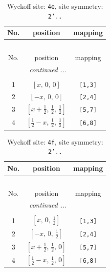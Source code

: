 \documentclass[fleqn,8pt]{jsarticle}
\begin{document}
\begin{longtable}{ccc}
\caption{Wyckoff site: {\tt 4e}, site symmetry: {\tt 2'..}}
 \\
 \hline \hline
No. & position & mapping \\ \hline \endfirsthead

\multicolumn{2}{l}{\tablename\ \thetable{}} \\
 \hline \hline
No. & position & mapping \\ \hline \endhead

 \hline \hline
\multicolumn{2}{r}{\footnotesize\it continued ...} \\ \endfoot

 \hline \hline
\multicolumn{2}{r}{} \\ \endlastfoot

1 & $\left[ x,\, 0,\, 0 \right]$ & {\tt [1,3]} \\ \hline
2 & $\left[ - x,\, 0,\, 0 \right]$ & {\tt [2,4]} \\ \hline
3 & $\left[ x + \frac{1}{2},\, \frac{1}{2},\, \frac{1}{2} \right]$ & {\tt [5,7]} \\ \hline
4 & $\left[ \frac{1}{2} - x,\, \frac{1}{2},\, \frac{1}{2} \right]$ & {\tt [6,8]} \\
\end{longtable}
\renewcommand{\arraystretch}{1.2}
\begin{longtable}{ccc}
\caption{Wyckoff site: {\tt 4f}, site symmetry: {\tt 2'..}}
 \\
 \hline \hline
No. & position & mapping \\ \hline \endfirsthead

\multicolumn{2}{l}{\tablename\ \thetable{}} \\
 \hline \hline
No. & position & mapping \\ \hline \endhead

 \hline \hline
\multicolumn{2}{r}{\footnotesize\it continued ...} \\ \endfoot

 \hline \hline
\multicolumn{2}{r}{} \\ \endlastfoot

1 & $\left[ x,\, 0,\, \frac{1}{2} \right]$ & {\tt [1,3]} \\ \hline
2 & $\left[ - x,\, 0,\, \frac{1}{2} \right]$ & {\tt [2,4]} \\ \hline
3 & $\left[ x + \frac{1}{2},\, \frac{1}{2},\, 0 \right]$ & {\tt [5,7]} \\ \hline
4 & $\left[ \frac{1}{2} - x,\, \frac{1}{2},\, 0 \right]$ & {\tt [6,8]} \\
\end{longtable}
\end{document}
